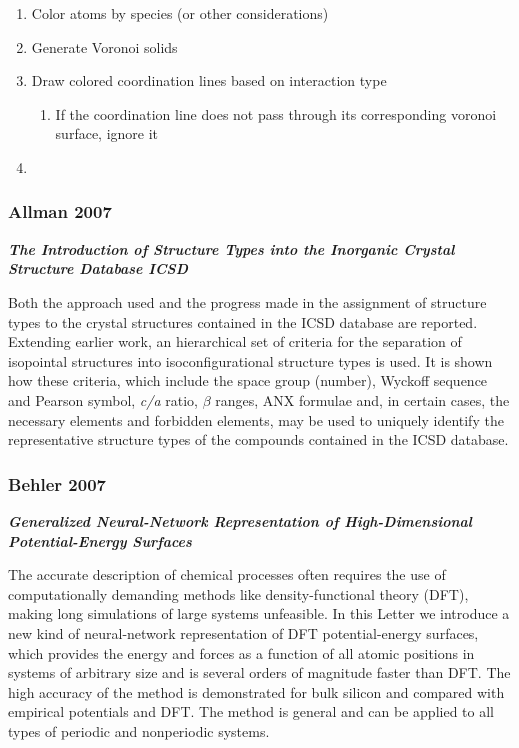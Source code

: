 \documentclass[11pt]{article}
\providecommand{\tightlist}{%
      \setlength{\itemsep}{0pt}\setlength{\parskip}{0pt}}
\begin{document}
\begin{enumerate}
\def\labelenumi{\arabic{enumi}.}
\item
  Color atoms by species (or other considerations)
\item
  Generate Voronoi solids
\item
  Draw colored coordination lines based on interaction type

  \begin{enumerate}
  \def\labelenumii{\alph{enumii}.}
  \tightlist
  \item
    If the coordination line does not pass through its corresponding
    voronoi surface, ignore it
  \end{enumerate}
\item
\end{enumerate}

    \subsubsection{Allman 2007}\label{allman-2007}

\textbf{\emph{The Introduction of Structure Types into the Inorganic
Crystal Structure Database ICSD}}

Both the approach used and the progress made in the assignment of
structure types to the crystal structures contained in the ICSD database
are reported. Extending earlier work, an hierarchical set of criteria
for the separation of isopointal structures into isoconfigurational
structure types is used. It is shown how these criteria, which include
the space group (number), Wyckoff sequence and Pearson symbol,
\emph{c/a} ratio, \(\beta\) ranges, ANX formulae and, in certain cases,
the necessary elements and forbidden elements, may be used to uniquely
identify the representative structure types of the compounds contained
in the ICSD database.

    \subsubsection{Behler 2007}\label{behler-2007}

\textbf{\emph{Generalized Neural-Network Representation of
High-Dimensional Potential-Energy Surfaces}}

The accurate description of chemical processes often requires the use of
computationally demanding methods like density-functional theory (DFT),
making long simulations of large systems unfeasible. In this Letter we
introduce a new kind of neural-network representation of DFT
potential-energy surfaces, which provides the energy and forces as a
function of all atomic positions in systems of arbitrary size and is
several orders of magnitude faster than DFT. The high accuracy of the
method is demonstrated for bulk silicon and compared with empirical
potentials and DFT. The method is general and can be applied to all
types of periodic and nonperiodic systems.
\end{document}
